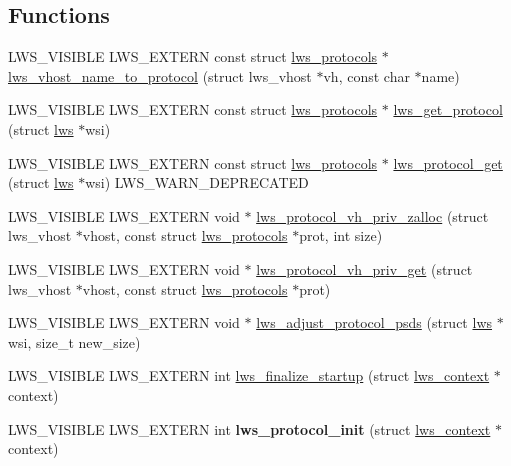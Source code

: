 \subsection*{Functions}
\begin{DoxyCompactItemize}
\item 
L\+W\+S\+\_\+\+V\+I\+S\+I\+B\+LE L\+W\+S\+\_\+\+E\+X\+T\+E\+RN const struct \hyperlink{structlws__protocols}{lws\+\_\+protocols} $\ast$ \hyperlink{group__Protocols-and-Plugins_ga2a4e5ce5e4492f77e892935397de5303}{lws\+\_\+vhost\+\_\+name\+\_\+to\+\_\+protocol} (struct lws\+\_\+vhost $\ast$vh, const char $\ast$name)
\item 
L\+W\+S\+\_\+\+V\+I\+S\+I\+B\+LE L\+W\+S\+\_\+\+E\+X\+T\+E\+RN const struct \hyperlink{structlws__protocols}{lws\+\_\+protocols} $\ast$ \hyperlink{group__Protocols-and-Plugins_ga72ad550786ca7976463589d347e62112}{lws\+\_\+get\+\_\+protocol} (struct \hyperlink{structlws}{lws} $\ast$wsi)
\item 
L\+W\+S\+\_\+\+V\+I\+S\+I\+B\+LE L\+W\+S\+\_\+\+E\+X\+T\+E\+RN const struct \hyperlink{structlws__protocols}{lws\+\_\+protocols} $\ast$ \hyperlink{group__Protocols-and-Plugins_ga181a7e600f9d921f483b05483d528fd8}{lws\+\_\+protocol\+\_\+get} (struct \hyperlink{structlws}{lws} $\ast$wsi) L\+W\+S\+\_\+\+W\+A\+R\+N\+\_\+\+D\+E\+P\+R\+E\+C\+A\+T\+ED
\item 
L\+W\+S\+\_\+\+V\+I\+S\+I\+B\+LE L\+W\+S\+\_\+\+E\+X\+T\+E\+RN void $\ast$ \hyperlink{group__Protocols-and-Plugins_gaf8bb5f2a2ac92f42e807d7335f9552c2}{lws\+\_\+protocol\+\_\+vh\+\_\+priv\+\_\+zalloc} (struct lws\+\_\+vhost $\ast$vhost, const struct \hyperlink{structlws__protocols}{lws\+\_\+protocols} $\ast$prot, int size)
\item 
L\+W\+S\+\_\+\+V\+I\+S\+I\+B\+LE L\+W\+S\+\_\+\+E\+X\+T\+E\+RN void $\ast$ \hyperlink{group__Protocols-and-Plugins_ga7e8d95fccf8654f5a0b6beadd7c8dbf1}{lws\+\_\+protocol\+\_\+vh\+\_\+priv\+\_\+get} (struct lws\+\_\+vhost $\ast$vhost, const struct \hyperlink{structlws__protocols}{lws\+\_\+protocols} $\ast$prot)
\item 
L\+W\+S\+\_\+\+V\+I\+S\+I\+B\+LE L\+W\+S\+\_\+\+E\+X\+T\+E\+RN void $\ast$ \hyperlink{group__Protocols-and-Plugins_ga40c0a7194f2ac0c2813ad7e374f0d852}{lws\+\_\+adjust\+\_\+protocol\+\_\+psds} (struct \hyperlink{structlws}{lws} $\ast$wsi, size\+\_\+t new\+\_\+size)
\item 
L\+W\+S\+\_\+\+V\+I\+S\+I\+B\+LE L\+W\+S\+\_\+\+E\+X\+T\+E\+RN int \hyperlink{group__Protocols-and-Plugins_ga106b37ae9c247e84d191ab09441adc43}{lws\+\_\+finalize\+\_\+startup} (struct \hyperlink{structlws__context}{lws\+\_\+context} $\ast$context)
\item 
\mbox{\label{group__Protocols-and-Plugins_ga502b1bc5295d2dc0f51fb95d9b8d7132}} 
L\+W\+S\+\_\+\+V\+I\+S\+I\+B\+LE L\+W\+S\+\_\+\+E\+X\+T\+E\+RN int {\bfseries lws\+\_\+protocol\+\_\+init} (struct \hyperlink{structlws__context}{lws\+\_\+context} $\ast$context)
\end{DoxyCompactItemize}


